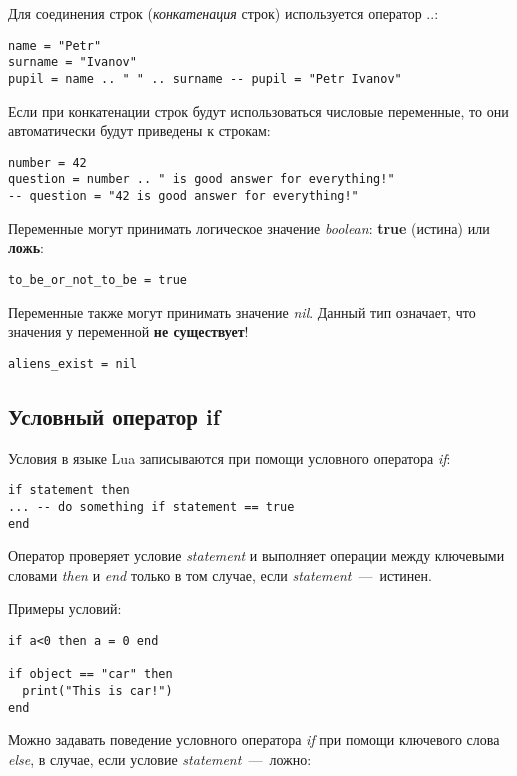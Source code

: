 Для соединения строк (\emph{конкатенация} строк) используется оператор $..$:

\begin{lstlisting}
name = "Petr"
surname = "Ivanov"
pupil = name .. " " .. surname -- pupil = "Petr Ivanov"
\end{lstlisting}

Если при конкатенации строк будут использоваться числовые переменные, то они автоматически будут приведены к строкам:

\begin{lstlisting}
number = 42
question = number .. " is good answer for everything!"
-- question = "42 is good answer for everything!"
\end{lstlisting}

Переменные могут принимать логическое значение \emph{boolean}: \textbf{true} (истина) или \textbf{ложь}:

\begin{lstlisting}
to_be_or_not_to_be = true
\end{lstlisting}

Переменные также могут принимать значение \emph{nil}. Данный тип означает, что значения у переменной \textbf{не существует}!

\begin{lstlisting}
aliens_exist = nil
\end{lstlisting}

\subsection{Условный оператор if}

Условия в языке Lua записываются при помощи условного оператора \emph{if}:

\begin{lstlisting}
if statement then
... -- do something if statement == true
end
\end{lstlisting}

Оператор проверяет условие \emph{statement} и выполняет операции между ключевыми словами \emph{then} и \emph{end} только в том случае, если \emph{statement}~---~истинен.

Примеры условий:

\begin{lstlisting}
if a<0 then a = 0 end

if object == "car" then
  print("This is car!")
end
\end{lstlisting}

Можно задавать поведение условного оператора \emph{if} при помощи ключевого слова \emph{else}, в случае, если условие \emph{statement}~---~ложно:

